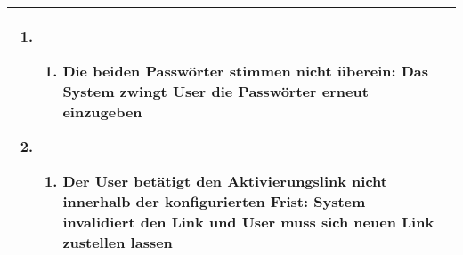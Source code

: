 \begin{tabular}{|l|p{}|}
\begin{enumerate}
\begin{enumerate}
\end{enumerate}
\item
\begin{enumerate}
\item Die beiden Passwörter stimmen nicht überein: Das System zwingt User die Passwörter erneut einzugeben
\end{enumerate}
\setcounter{enumi}{8}
\item
\begin{enumerate}
\item Der User betätigt den Aktivierungslink nicht innerhalb der konfigurierten Frist: System invalidiert den Link und User muss sich neuen Link zustellen lassen
\end{enumerate}
\end{enumerate}
\\ \hline
\end{tabular}